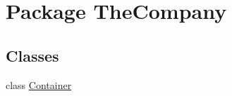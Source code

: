\hypertarget{namespace_the_company}{}\section{Package The\+Company}
\label{namespace_the_company}
\subsection*{Classes}
\begin{DoxyCompactItemize}
\item 
class \hyperlink{class_the_company_1_1_container}{Container}
\end{DoxyCompactItemize}
